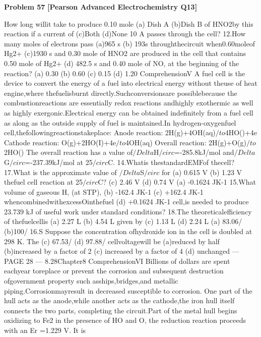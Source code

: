\begin{problembox}
\textbf{Problem 57} \hfill \textbf{[Pearson Advanced Electrochemistry Q13]}
\label{q:ext-pearson-57}

How long willit take to produce 0.10 mole
(a) Dish A
(b)Dish B
of HNO2by this reaction if a current of
(c)Both
(d)None
10 A passes through the cell?
12.How many moles of electrons pass
(a)965 s
(b) 193s
throughthecircuit when0.60moleof Hg2+
(c)1930 s
and 0.30 mole of HNO2 are produced in
the cell that contains 0.50 mole of Hg2+
(d) 482.5 s
and 0.40 mole of NO, at the beginning
of the reaction?
(a) 0.30
(b) 0.60
(c) 0.15
(d) 1.20
ComprehensionV
A fuel cell is the device to convert the energy of a fuel into electrical energy without theuse of heat
engine,where thefuelisburnt directly.Suchconversionsare possiblebecause the combustionreactions
are essentially redox reactions andhighly exothermic as well as highly exergonic.Electrical energy
can be obtained indefinitely from a fuel cell as along as the outside supply of fuel is maintained.In
hydrogen-oxygenfuel cell,thefollowingreactionstakeplace:
Anode reaction:
2H(g)+4OH(aq)$/to$4HO()+4e
Cathode reaction:
O(g)+2HO(I)+4e$/to$4OH(aq)
Overall reaction:
2H(g)+O(g)$/to$2HO()
The overall reaction has a value of$/Delta$H$/circ$=-285.8kJ/mol and$/Delta$G$/circ$=-237.39kJ/mol at 25$/circ$C.
14.Whatis thestandardEMFof thecell?
17.What is the approximate value of $/Delta$S$/circ$ for
(a) 0.615 V
(b) 1.23 V
thefuel cell reaction at 25$/circ$C?
(c) 2.46 V
(d) 0.74 V
(a) -0.1624 JK-1
15.What volume of gaseous H, (at STP),
(b) -162.4 JK-1
(c) +162.4 JK-1
whencombinedwithexcessOinthefuel
(d) +0.1624 JK-1
cell,is needed to produce 23.739 kJ of
useful work under standard conditions?
18.The theoreticalefficiency of thefuelcellis
(a) 2.27 L
(b) 4.54 L
given by
(c) 1.13 L
(d) 2.24 L
(a) 83.06/%
(b)100/%
16.S
Suppose the concentration ofhydroxide
ion in the cell is doubled at 298 K. The
(c) 67.53/%
(d) 97.88/%
cellvoltagewill be
(a)reduced by half
(b)increased by a factor of 2
(c) increased by a factor of 4
(d) unchanged
--- PAGE 28 ---
8.28Chapter8
ComprehensionVI
Billions of dollars are spent eachyear toreplace or prevent the corrosion and subsequent destruction
ofgovernment property such asships,bridges,and metallic piping.Corrosionmayresult in decreased
susceptible to corrosion. One part of the hull acts as the anode,while another acts as the cathode,the
iron hull itself connects the two parts, completing the circuit.Part of the metal hull begins oxidizing
to Fe$2$ in the presence of HO and O, the reduction reaction proceeds with an Er =1.229 V. It is

\end{problembox}
